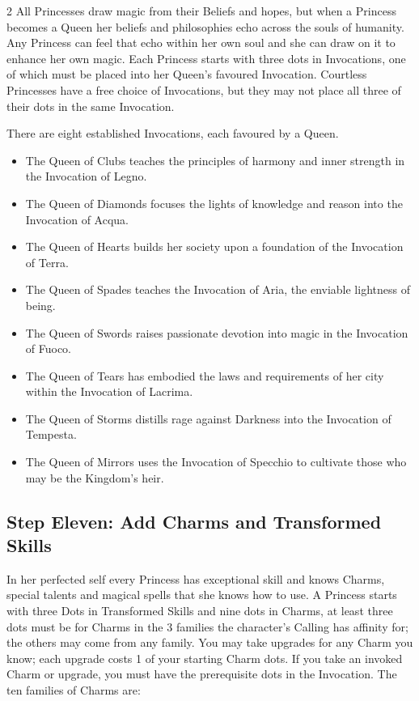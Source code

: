 \begin{multicols}{2}
All Princesses draw magic from their Beliefs and hopes, but when a Princess becomes a Queen her beliefs and philosophies echo across the souls of humanity. Any Princess can feel that echo within her own soul and she can draw on it to enhance her own magic. Each Princess starts with three dots in Invocations, one of which must be placed into her Queen's favoured Invocation. Courtless Princesses have a free choice of Invocations, but they may not place all three of their dots in the same Invocation. 

There are eight established Invocations, each favoured by a Queen.

\begin{itemize}
\item The Queen of Clubs teaches the principles of harmony and inner strength in the Invocation of Legno.
\item The Queen of Diamonds focuses the lights of knowledge and reason into the Invocation of Acqua.
\item The Queen of Hearts builds her society upon a foundation of the Invocation of Terra.
\item The Queen of Spades teaches the Invocation of Aria, the enviable lightness of being.
\item The Queen of Swords raises passionate devotion into magic in the Invocation of Fuoco.
\item The Queen of Tears has embodied the laws and requirements of her city within the Invocation of Lacrima.
\item The Queen of Storms distills rage against Darkness into the Invocation of Tempesta.
\item The Queen of Mirrors uses the Invocation of Specchio to cultivate those who may be the Kingdom’s heir.
\end{itemize}

\subsection*{Step Eleven: Add Charms and Transformed Skills}

In her perfected self every Princess has exceptional skill and knows Charms, special talents and magical spells that she knows how to use. A Princess starts with three Dots in Transformed Skills and nine dots in Charms, at least three dots must be for Charms in the 3 families the character's Calling has affinity for; the others may come from any family. You may take upgrades for any Charm you know; each upgrade costs 1 of your starting Charm dots. If you take an invoked Charm or upgrade, you must have the prerequisite dots in the Invocation. The ten families of Charms are: 


\end{multicols}
